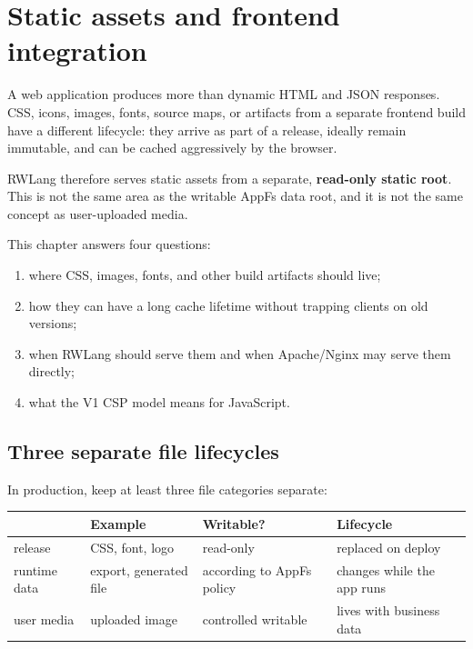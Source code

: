 \chapter{Static assets and frontend integration}

A web application produces more than dynamic HTML and JSON responses. CSS, icons, images, fonts, source maps, or artifacts from a separate frontend build have a different lifecycle: they arrive as part of a release, ideally remain immutable, and can be cached aggressively by the browser.

RWLang therefore serves static assets from a separate, \textbf{read-only static root}. This is not the same area as the writable AppFs data root, and it is not the same concept as user-uploaded media.

This chapter answers four questions:

\begin{enumerate}
  \item where CSS, images, fonts, and other build artifacts should live;
  \item how they can have a long cache lifetime without trapping clients on old versions;
  \item when RWLang should serve them and when Apache/Nginx may serve them directly;
  \item what the V1 CSP model means for JavaScript.
\end{enumerate}

\section{Three separate file lifecycles}

In production, keep at least three file categories separate:

\begin{center}
\begin{tabularx}{\textwidth}{@{}lYYY@{}}
\toprule
 & Example & Writable? & Lifecycle \\
\midrule
release & CSS, font, logo & read-only & replaced on deploy \\
runtime data & export, generated file & according to AppFs policy & changes while the app runs \\
user media & uploaded image & controlled writable & lives with business data \\
\bottomrule
\end{tabularx}
\end{center}

